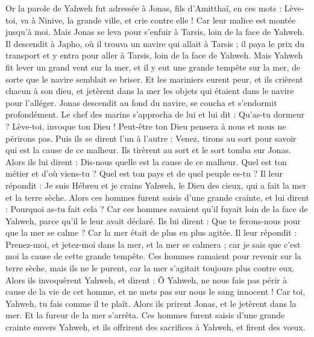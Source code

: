 \begin{multicols}{2}
\VerseOne{}Or la parole de Yahweh fut adressée à Jonas, fils d'Amitthaï, en ces mots :
Lève-toi, va à Ninive, la grande ville, et crie contre elle ! Car leur malice est montée jusqu'à moi.
Mais Jonas se leva pour s'enfuir à Tarsis, loin de la face de Yahweh. Il descendit à Japho, où il trouva un navire qui allait à Tarsis ; il paya le prix du transport et y entra pour aller à Tarsis, loin de la face de Yahweh.
Mais Yahweh fit lever un grand vent sur la mer, et il y eut une grande tempête sur la mer, de sorte que le navire semblait se briser.
Et les mariniers eurent peur, et ils crièrent chacun à son dieu, et jetèrent dans la mer les objets qui étaient dans le navire pour l'alléger. Jonas descendit au fond du navire, se coucha et s'endormit profondément.
Le chef des marins s'approcha de lui et lui dit : Qu'as-tu dormeur ? Lève-toi, invoque ton Dieu ! Peut-être ton Dieu pensera à nous et nous ne périrons pas.
Puis ils se dirent l'un à l'autre : Venez, tirons au sort pour savoir qui est la cause de ce malheur. Ils tirèrent au sort et le sort tomba sur Jonas.
Alors ils lui dirent : Dis-nous quelle est la cause de ce malheur. Quel est ton métier et d'où viens-tu ? Quel est ton pays et de quel peuple es-tu ?
Il leur répondit : Je suis Hébreu et je crains Yahweh, le Dieu des cieux, qui a fait la mer et la terre sèche.
Alors ces hommes furent saisis d'une grande crainte, et lui dirent : Pourquoi as-tu fait cela ? Car ces hommes savaient qu'il fuyait loin de la face de Yahweh, parce qu'il le leur avait déclaré.
Ils lui dirent : Que te ferons-nous pour que la mer se calme ? Car la mer était de plus en plus agitée.
Il leur répondit : Prenez-moi, et jetez-moi dans la mer, et la mer se calmera ; car je sais que c'est moi la cause de cette grande tempête.
Ces hommes ramaient pour revenir sur la terre sèche, mais ils ne le purent, car la mer s'agitait toujours plus contre eux.
Alors ils invoquèrent Yahweh, et dirent : Ô Yahweh, ne nous fais pas périr à cause de la vie de cet homme, et ne mets pas sur nous le sang innocent ! Car toi, Yahweh, tu fais comme il te plaît.
Alors ils prirent Jonas, et le jetèrent dans la mer. Et la fureur de la mer s'arrêta.
Ces hommes furent saisis d'une grande crainte envers Yahweh, et ils offrirent des sacrifices à Yahweh, et firent des vœux.

\end{multicols}
